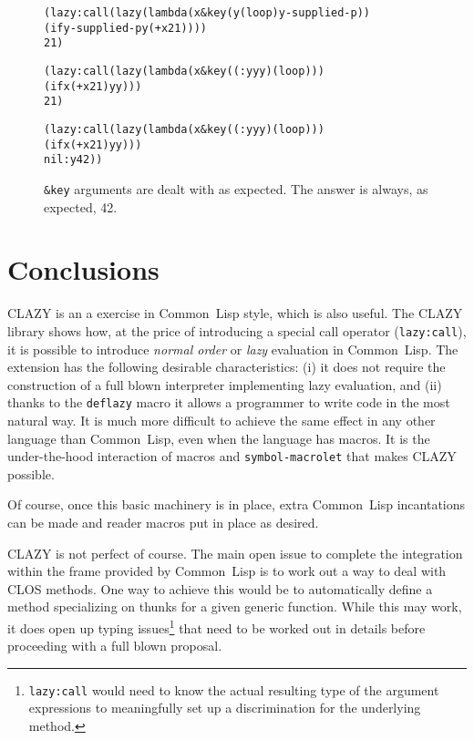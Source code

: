 \documentclass[fleqn,10pt]{article}
\newcommand{\CL}{\textsf{Common~Lisp}}
\newcommand{\CLAZY}{\textsf{CLAZY}}
\newcommand{\code}[1]{\texttt{#1}}
\begin{document}
\begin{figure}
\hrulefill
\begin{alltt}
   (lazy:call (lazy (lambda (x &key (y (loop) y-supplied-p))
                       (if y-supplied-p y (+ x 21))))
              21)

   (lazy:call (lazy (lambda (x &key ((:y yy) (loop)))
                         (if x (+ x 21) yy)))
              21)

   (lazy:call (lazy (lambda (x &key ((:y yy) (loop)))
                       (if x (+ x 21) yy)))
              nil :y 42))
\end{alltt}
\hrulefill
\caption{\code{\&key} arguments are dealt with as expected.  The
  answer is always, as expected, 42.}
\label{fig:keyword-calls}
\end{figure}

\section{Conclusions}

\CLAZY{} is an a exercise in \CL{} style, which is also useful.  The
\CLAZY{} library shows how, at the price of introducing a special call
operator (\code{lazy:call}), it is possible to introduce \emph{normal
  order} or \emph{lazy} evaluation in \CL{}.  The extension has the
following desirable characteristics: (i) it does not require the
construction of a full blown interpreter implementing lazy evaluation,
and (ii) thanks to the \code{deflazy} macro it allows a programmer to
write code in the most natural way.  It is much more
difficult to achieve the same effect in any other language than \CL{},
even when the language has macros.  It is the under-the-hood
interaction of macros and \code{symbol-macrolet} that makes \CLAZY{}
possible.

Of course, once this basic machinery is in place, extra \CL{}
incantations can be made and reader macros put in place as desired.

\CLAZY{} is not perfect of course.  The main open issue to complete
the integration within the frame provided by \CL{} is to work out a
way to deal with \textsf{CLOS} methods.  One way to achieve this would
be to automatically define a method specializing on thunks for a given
generic function.  While this may work, it does open up typing
issues\footnote{\code{lazy:call} would need to know the actual
  resulting type of the argument expressions to meaningfully set up a
  discrimination for the underlying method.} that need to be worked
out in details before proceeding with a full blown proposal.


\nocite{CLHS}



\end{document}
